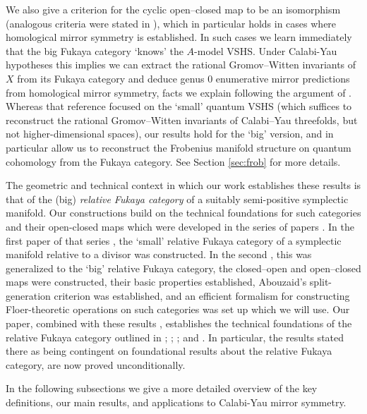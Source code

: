 \documentclass{article}
\begin{document}
We also give a criterion for the cyclic open--closed map to be an isomorphism (analogous criteria were stated in \cite{Ganatra2015}), which in particular holds in cases where homological mirror symmetry is established. In such cases we learn immediately that the big Fukaya category `knows' the $A$-model VSHS. Under Calabi-Yau hypotheses this implies we can extract the rational Gromov--Witten invariants of $X$ from its Fukaya category and deduce genus 0 enumerative mirror predictions from homological mirror symmetry, facts we explain following the argument of \cite{Ganatra2015}. 
Whereas that reference focused on the `small' quantum VSHS (which suffices to reconstruct the rational Gromov--Witten invariants of Calabi--Yau threefolds, but not higher-dimensional spaces), our results hold for the `big' version, and in particular allow us to reconstruct the Frobenius manifold structure on quantum cohomology from the Fukaya category. See Section \ref{sec:frob} for more details.

The geometric and technical context in which our work establishes these results is that of the (big) {\em relative Fukaya category} of a suitably semi-positive symplectic manifold. Our constructions build on the technical foundations for such categories and their open-closed maps which were developed in the series of papers \cite{perutz2022constructing,relfukii}. 
In the first paper of that series \cite{perutz2022constructing}, the `small' relative Fukaya category of a symplectic manifold relative to a divisor was constructed.  In the second \cite{relfukii}, this was generalized to the `big' relative Fukaya category, the closed--open and open--closed maps were constructed, their basic properties established, Abouzaid's split-generation criterion was established, and an efficient formalism for constructing Floer-theoretic operations on such categories was set up which we will use.
Our paper, combined with these results \cite{perutz2022constructing,relfukii}, establishes the technical foundations of the relative Fukaya category outlined in \cite[Section 4]{Ganatra2015}; \cite[Section 2.5]{sheridan2021homological}; \cite[Theorems B and C]{Ganatra2023integrality}; and \cite[Theorem B]{GHHPS}. 
In particular, the results stated there as being contingent on foundational results about the relative Fukaya category, are now proved unconditionally. 

In the following subsections we give a more detailed overview of the key definitions, our main results, and applications to Calabi-Yau mirror symmetry.
\end{document}
